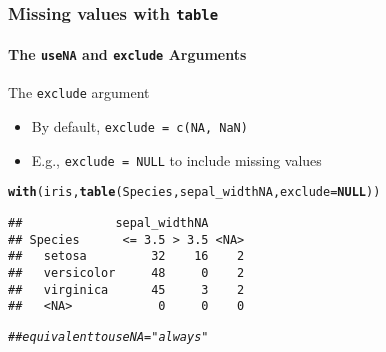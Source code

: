 \documentclass[paper=screen,mathserif]{beamer}\usepackage[]{graphicx}\usepackage[]{color}
\makeatletter
\newcommand{\hlcom}[1]{\textcolor[rgb]{0.678,0.584,0.686}{\textit{#1}}}%
\newcommand{\hlstd}[1]{\textcolor[rgb]{0.345,0.345,0.345}{#1}}%
\newcommand{\hlkwa}[1]{\textcolor[rgb]{0.161,0.373,0.58}{\textbf{#1}}}%
\newcommand{\hlkwc}[1]{\textcolor[rgb]{0.333,0.667,0.333}{#1}}%
\newcommand{\hlkwd}[1]{\textcolor[rgb]{0.737,0.353,0.396}{\textbf{#1}}}%
\newenvironment{kframe}{%
 \def\at@end@of@kframe{}%
 \ifinner\ifhmode%
  \def\at@end@of@kframe{\end{minipage}}%
  \begin{minipage}{\columnwidth}%
 \fi\fi%
 \def\FrameCommand##1{\hskip\@totalleftmargin \hskip-\fboxsep
 \colorbox{shadecolor}{##1}\hskip-\fboxsep
     \hskip-\linewidth \hskip-\@totalleftmargin \hskip\columnwidth}%
 \MakeFramed {\advance\hsize-\width
   \@totalleftmargin\z@ \linewidth\hsize
   \@setminipage}}%
 {\par\unskip\endMakeFramed%
 \at@end@of@kframe}
\newenvironment{knitrout}{}{} %
\newcommand{\ft}[1]{\frametitle{#1}}
\newcommand{\fst}[1]{\framesubtitle{#1}}
\makeatother
\begin{document}
\begin{frame}[fragile]
  \ft{Missing values with {\tt table}}
  \fst{The {\tt useNA} and {\tt exclude} Arguments}
  The \verb=exclude= argument
  \begin{itemize}
  \item By default, \verb|exclude = c(NA, NaN)|
  \item E.g., \verb|exclude = NULL| to include missing values
  \end{itemize}

\begin{knitrout}\scriptsize
{}\color{fgcolor}\begin{kframe}
\begin{alltt}
\hlkwd{with}\hlstd{(iris,} \hlkwd{table}\hlstd{(Species, sepal_widthNA,} \hlkwc{exclude} \hlstd{=} \hlkwa{NULL}\hlstd{))}
\end{alltt}
\begin{verbatim}
##             sepal_widthNA
## Species      <= 3.5 > 3.5 <NA>
##   setosa         32    16    2
##   versicolor     48     0    2
##   virginica      45     3    2
##   <NA>            0     0    0
\end{verbatim}
\begin{alltt}
\hlcom{## equivalent to useNA = "always"}
\end{alltt}
\end{kframe}
\end{knitrout}

\end{frame}
\end{document}
